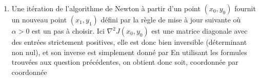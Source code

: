 \documentclass{article}
\begin{document}
\begin{enumerate}
	\item Une itération de l'algorithme de Newton à partir d'un point $(x_0,y_0)$ fournit un nouveau point $(x_1,y_1)$ défini par la règle de mise à jour suivante
	où $\alpha > 0$ est un pas à choisir. Ici $\nabla^2 J(x_0,y_0)$ est une matrice diagonale avec des entrées strictement positives, elle est donc bien inversible (déterminant non nul), et son inverse est simplement donné par
	En utilisant les formules trouvées aux question précédentes, on obtient donc
	soit, coordonnée par coordonnée
	

\end{enumerate}
\end{document}
